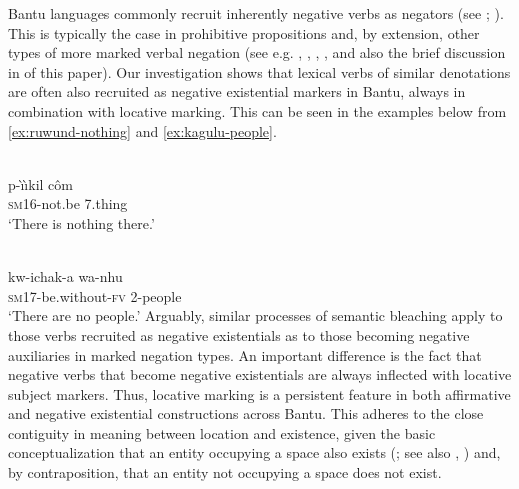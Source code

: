 \documentclass[output=paper,draft,draftmode,colorlinks,citecolor=brown]{langscibook}
\begin{document}
Bantu languages commonly recruit inherently negative verbs as negators (see \citealt{Givon1973}; \citeyear[382--383]{Givon2001}). This is typically the case in prohibitive propositions and, by extension, other types of more marked verbal negation (see e.g. \citealt{Bernander2018}, \citealt{DevosOlmen2013}, 
\citealt{Guldemann1999}, \citealt[191--193]{Nurse2008}, and also the brief discussion in  of this paper). Our investigation shows that lexical verbs of similar denotations are often also recruited as negative existential markers in Bantu, always in combination with locative marking. This can be seen in the examples below from  \ref{ex:ruwund-nothing} and  \ref{ex:kagulu-people}.

\ea\label{ex:ruwund-nothing}
\\
\gll p-{\`\i}{\`\i}kil c{\^o}m\\
	\textsc{sm}16-not.be 7.thing \\
\glt `There is nothing there.'
\z

\ea\label{ex:kagulu-people}
\\
\gll kw-ichak-a wa-nhu\\
	\textsc{sm}17-be.without-\textsc{fv} 2-people\\
\glt `There are no people.'
\z
Arguably, similar processes of semantic bleaching apply to those verbs
recruited as negative existentials as to those becoming negative
auxiliaries in marked negation types. An important difference is the fact that negative verbs that become negative existentials are always inflected with locative subject markers. Thus, locative marking is a persistent feature in both affirmative and negative existential constructions across Bantu. This adheres to the close contiguity in meaning between location and existence, given the basic conceptualization that an entity occupying a space also exists (\citealt[407]{Lakoff1987}; see also \citealt{Gaeta2013}, \citealt{Koch2012}) and, by contraposition, that an entity not occupying a space does not exist.
\end{document}
